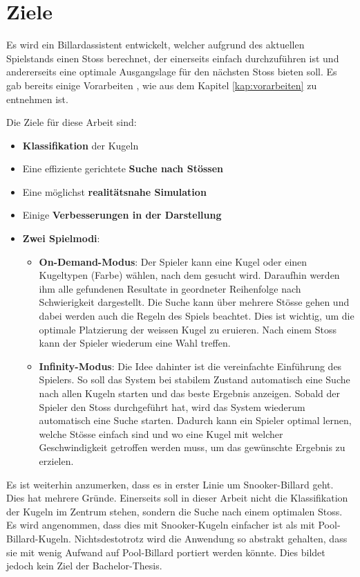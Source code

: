 \chapter{Ziele}\label{kap:ziele}
Es wird ein Billardassistent entwickelt, welcher aufgrund des aktuellen Spielstands einen Stoss berechnet, der einerseits
einfach durchzuführen ist und andererseits eine optimale Ausgangslage für den nächsten Stoss bieten soll. Es gab bereits
einige Vorarbeiten \cite{project2:ziele}, wie aus dem Kapitel \ref{kap:vorarbeiten} zu entnehmen ist.

Die Ziele für diese Arbeit sind:
\begin{itemize}
    \item \textbf{Klassifikation} der Kugeln
    \item Eine effiziente gerichtete \textbf{Suche nach Stössen}
    \item Eine möglichst \textbf{realitätsnahe Simulation}
    \item Einige \textbf{Verbesserungen in der Darstellung}
    \item \textbf{Zwei Spielmodi}: \leavevmode
    \begin{itemize}
        \item \textbf{On-Demand-Modus}:
        Der Spieler kann eine Kugel oder einen Kugeltypen (Farbe) wählen, nach dem gesucht wird.
        Daraufhin werden ihm alle gefundenen Resultate in geordneter Reihenfolge nach Schwierigkeit dargestellt.
        Die Suche kann über mehrere Stösse gehen und dabei werden auch die Regeln des Spiels beachtet.
        Dies ist wichtig, um die optimale Platzierung der weissen Kugel zu eruieren.
        Nach einem Stoss kann der Spieler wiederum eine Wahl treffen.
        \item \textbf{Infinity-Modus}:
        Die Idee dahinter ist die vereinfachte Einführung des Spielers.
        So soll das System bei stabilem Zustand automatisch eine Suche nach allen Kugeln starten und das beste Ergebnis anzeigen.
        Sobald der Spieler den Stoss durchgeführt hat, wird das System wiederum automatisch eine Suche starten.
        Dadurch kann ein Spieler optimal lernen, welche Stösse einfach sind und wo eine Kugel mit welcher Geschwindigkeit
        getroffen werden muss, um das gewünschte Ergebnis zu erzielen.
    \end{itemize}
\end{itemize}

Es ist weiterhin anzumerken, dass es in erster Linie um Snooker-Billard geht. Dies hat mehrere Gründe. Einerseits soll
in dieser Arbeit nicht die Klassifikation der Kugeln im Zentrum stehen, sondern die Suche nach einem optimalen Stoss.
Es wird angenommen, dass dies mit Snooker-Kugeln einfacher ist als mit Pool-Billard-Kugeln.
Nichtsdestotrotz wird die Anwendung so abstrakt gehalten, dass sie mit wenig Aufwand
auf Pool-Billard portiert werden könnte. Dies bildet jedoch kein Ziel der Bachelor-Thesis.

